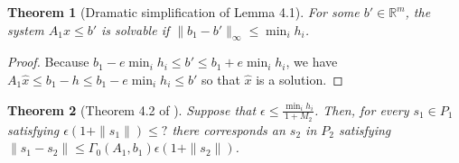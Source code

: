 \documentclass{article}
\newtheorem{theorem}{Theorem}[section]
\theoremstyle{case}
\newcommand{\Rm}{\mathbb R^m}
\begin{document}
% 
% 
\color{black}


\begin{theorem}[Dramatic simplification of Lemma 4.1]
\label{4_1}
For some $b' \in \Rm$, the system $A_1x \le b'$ is solvable if $\|b_1 - b'\|_{\infty} \le \min_i h_i$.
\end{theorem}

\begin{proof}
Because $b_1 - e \min_i h_i \le b' \le b_1 + e \min_i h_i$, we have $A_1\hat x\le b_1 - h\le b_1 - e \min_i h_i \le b'$ so that $\hat x$ is a solution.
\end{proof}




\begin{theorem}[Theorem 4.2 of \cite{dummy:perturbations}]
\label{4_2}
Suppose that $\epsilon \le \frac{\min_i h_i}{1 + M_2}$.
Then, for every $s_1 \in P_1$ satisfying $\epsilon(1 + \|s_1\|) \le ?$ there corresponds an $s_2$ in $P_2$ satisfying 
$\|s_1 - s_2\|\le \Gamma_0(A_1, b_1)\epsilon (1 + \|s_2\|)$.
\end{theorem}
\end{document}
